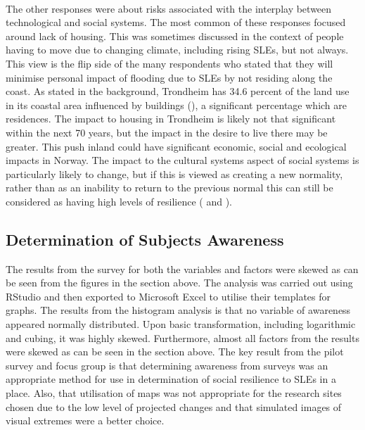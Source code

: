 \paragraph{}
The other responses were about risks associated with the interplay between technological and social systems. The most common of these responses focused around lack of housing. This was sometimes discussed in the context of people having to move due to changing climate, including rising SLEs, but not always. This view is the flip side of the many respondents who stated that they will minimise personal impact of flooding due to SLEs by not residing along the coast.  As stated in the background, Trondheim has 34.6 percent of the land use in its coastal area influenced by buildings (\cite{engebakken_construction_2022}), a significant percentage which are residences. The impact to housing in Trondheim is likely not that significant within the next 70 years, but the impact in the desire to live there may be greater. This push inland could have significant economic, social and ecological impacts in Norway. The impact to the cultural systems aspect of social systems is particularly likely to change, but if this is viewed as creating a new normality, rather than as an inability to return to the previous normal this can still be considered as having high levels of resilience (\cite{cutter_place-based_2008} and \cite{cutter_community_2020}).
\paragraph{}





\subsection{Determination of Subjects Awareness}
The results from the survey for both the variables and factors were skewed as can be seen from the figures in the section above. The analysis was carried out using RStudio and then exported to Microsoft Excel to utilise their templates for graphs. The results from the histogram analysis is that no variable of awareness appeared normally distributed. Upon basic transformation, including logarithmic and cubing, it was highly skewed. Furthermore, almost all factors from the results were skewed as can be seen in the section above. The key result from the pilot survey and focus group is that determining awareness from surveys was an appropriate method for use in determination of social resilience to SLEs in a place. Also, that utilisation of maps was not appropriate for the research sites chosen due to the low level of projected changes and that simulated images of visual extremes were a better choice.


